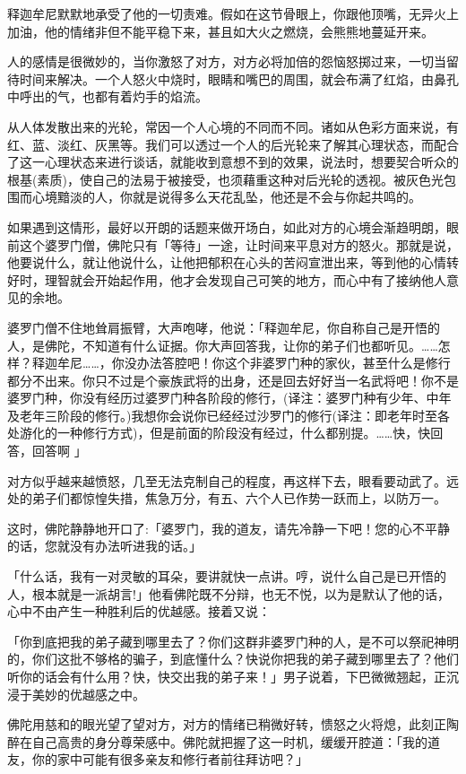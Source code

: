 \documentclass[twoside,openany]{book}
\begin{document}
释迦牟尼默默地承受了他的一切责难。假如在这节骨眼上，你跟他顶嘴，无异火上加油，他的情绪非但不能平稳下来，甚且如大火之燃烧，会熊熊地蔓延开来。

人的感情是很微妙的，当你激怒了对方，对方必将加倍的怨恼怒掷过来，一切当留待时间来解决。一个人怒火中烧时，眼睛和嘴巴的周围，就会布满了红焰，由鼻孔中呼出的气，也都有着灼手的焰流。

从人体发散出来的光轮，常因一个人心境的不同而不同。诸如从色彩方面来说，有红、蓝、淡红、灰黑等。我们可以透过一个人的后光轮来了解其心理状态，而配合了这一心理状态来进行谈话，就能收到意想不到的效果，说法时，想要契合听众的根基(素质)，使自己的法易于被接受，也须藉重这种对后光轮的透视。被灰色光包围而心境黯淡的人，你就是说得多么天花乱坠，他还是不会与你起共鸣的。

如果遇到这情形，最好以开朗的话题来做开场白，如此对方的心境会渐趋明朗，眼前这个婆罗门僧，佛陀只有「等待」一途，让时间来平息对方的怒火。那就是说，他要说什么，就让他说什么，让他把郁积在心头的苦闷宣泄出来，等到他的心情转好时，理智就会开始起作用，他才会发现自己可笑的地方，而心中有了接纳他人意见的余地。

婆罗门僧不住地耸肩振臂，大声咆哮，他说：「释迦牟尼，你自称自己是开悟的人，是佛陀，不知道有什么证据。你大声回答我，让你的弟子们也都听见。……怎样？释迦牟尼……，你没办法答腔吧！你这个非婆罗门种的家伙，甚至什么是修行都分不出来。你只不过是个豪族武将的出身，还是回去好好当一名武将吧！你不是婆罗门种，你没有经历过婆罗门种各阶段的修行，{(\kaishu 译注：婆罗门种有少年、中年及老年三阶段的修行。)}我想你会说你已经经过沙罗门的修行({\kaishu 译注：即老年时至各处游化的一种修行方式})，但是前面的阶段没有经过，什么都别提。……快，快回答，回答啊	」

对方似乎越来越愤怒，几至无法克制自己的程度，再这样下去，眼看要动武了。远处的弟子们都惊惶失措，焦急万分，有五、六个人已作势一跃而上，以防万一。

这时，佛陀静静地开口了:「婆罗门，我的道友，请先冷静一下吧！您的心不平静的话，您就没有办法听进我的话。」

「什么话，我有一对灵敏的耳朵，要讲就快一点讲。哼，说什么自己是已开悟的人，根本就是一派胡言!」他看佛陀既不分辩，也无不悦，以为是默认了他的话，心中不由产生一种胜利后的优越感。接着又说：

「你到底把我的弟子藏到哪里去了？你们这群非婆罗门种的人，是不可以祭祀神明的，你们这批不够格的骗子，到底懂什么？快说你把我的弟子藏到哪里去了？他们听你的话会有什么用？快，快交出我的弟子来！」男子说着，下巴微微翘起，正沉浸于美妙的优越感之中。

佛陀用慈和的眼光望了望对方，对方的情绪已稍微好转，愦怒之火将熄，此刻正陶醉在自己高贵的身分尊荣感中。佛陀就把握了这一时机，缓缓开腔道：「我的道友，你的家中可能有很多亲友和修行者前往拜访吧？」
\end{document}
